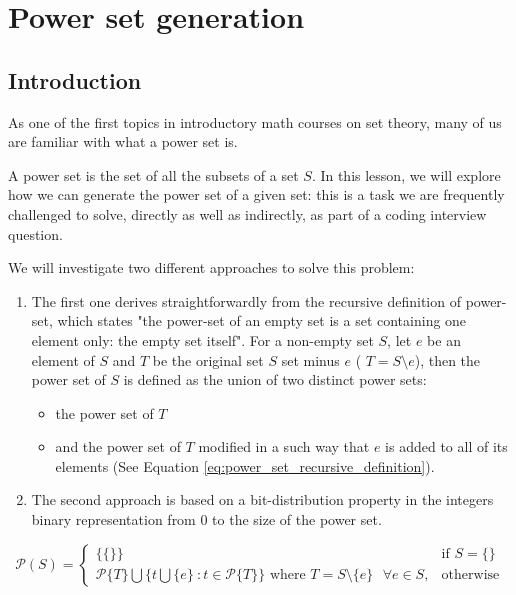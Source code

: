 %


\chapter{Power set generation}
\label{ch:power_set}
\section*{Introduction}

As one of the first topics in introductory math courses on set theory, many of us are familiar with what a power set is.

A power set is the set of all the subsets of a set $S$.  In this lesson, we will explore how we can generate the power set of a given set: this is a task we are frequently challenged to solve, directly as well as indirectly, as part of a coding interview question.

We will investigate two different approaches to solve this problem: 

\begin{enumerate}
    \item The first one derives straightforwardly from the recursive definition of power-set, which states "the power-set of an empty set is a set containing one element only: the empty set itself". 
    For a non-empty set $S$, let $e$ be an element of $S$ and $T$ be the original set $S$ set minus $e$ ( $T=S \setminus e$), then the power set of $S$ is defined as the union of two distinct power sets:
    \begin{itemize}
        \item   the power set of $T$
        \item   and the power set of $T$ modified in a such way that $e$ is added to all of its elements (See Equation \ref{eq:power_set_recursive_definition}).  
    \end{itemize}
    \item The second approach is based on a bit-distribution property in the integers binary representation from $0$ to the size of the power set.

\end{enumerate}

\begin{equation}
    \mathcal{P}(S)=\begin{cases} 
    \{\{\}\} & \text{if } S=\{\} \\
    \mathcal{P}\{T\} \bigcup \{t \bigcup \{e\} \: : t \in \mathcal{P}\{T\}\} \text{ where }  T = S \setminus \{e\} \text{ } \forall e \in S, & \text{otherwise}
    \end{cases}
    \label{eq:power_set_recursive_definition}
\end{equation}



